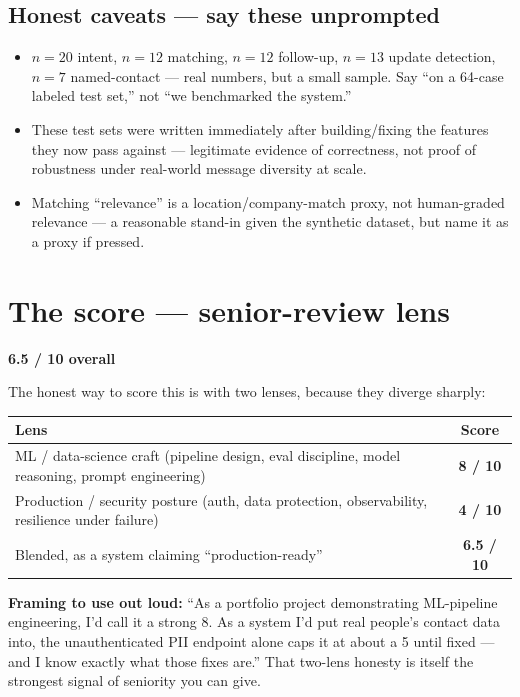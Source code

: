 \documentclass[11pt, a4paper]{article}
\begin{document}
\subsection{Honest caveats --- say these unprompted}
\begin{itemize}
    \item $n=20$ intent, $n=12$ matching, $n=12$ follow-up, $n=13$ update detection, $n=7$ named-contact --- real numbers, but a small sample. Say ``on a 64-case labeled test set,'' not ``we benchmarked the system.''
    \item These test sets were written immediately after building/fixing the features they now pass against --- legitimate evidence of correctness, not proof of robustness under real-world message diversity at scale.
    \item Matching ``relevance'' is a location/company-match proxy, not human-graded relevance --- a reasonable stand-in given the synthetic dataset, but name it as a proxy if pressed.
\end{itemize}

\section{The score --- senior-review lens}

\begin{center}
{\Large \textbf{6.5 / 10 overall}}
\end{center}

The honest way to score this is with two lenses, because they diverge sharply:

\begin{center}
\begin{tabular}{@{}p{8cm}c@{}}
\toprule
Lens & Score \\
\midrule
ML / data-science craft (pipeline design, eval discipline, model reasoning, prompt engineering) & \textbf{8 / 10} \\
Production / security posture (auth, data protection, observability, resilience under failure) & \textbf{4 / 10} \\
\midrule
Blended, as a system claiming ``production-ready'' & \textbf{6.5 / 10} \\
\bottomrule
\end{tabular}
\end{center}

\textbf{Framing to use out loud:} ``As a portfolio project demonstrating ML-pipeline engineering, I'd call it a strong 8. As a system I'd put real people's contact data into, the unauthenticated PII endpoint alone caps it at about a 5 until fixed --- and I know exactly what those fixes are.'' That two-lens honesty is itself the strongest signal of seniority you can give.
\end{document}
